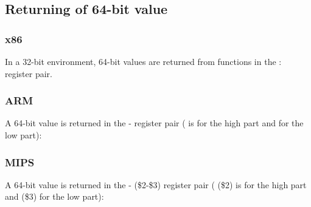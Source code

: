 ﻿\subsection{Returning of 64-bit value}



\subsubsection{x86}

In a 32-bit environment, 64-bit values are returned from functions in the \EDX{}:\EAX{} register pair.



\subsubsection{ARM}

A 64-bit value is returned in the - register pair ( is for the high part and  for the low part):



\subsubsection{MIPS}

A 64-bit value is returned in the - (\$2-\$3) register pair ( (\$2) is for the high part and  (\$3) for the low part):




